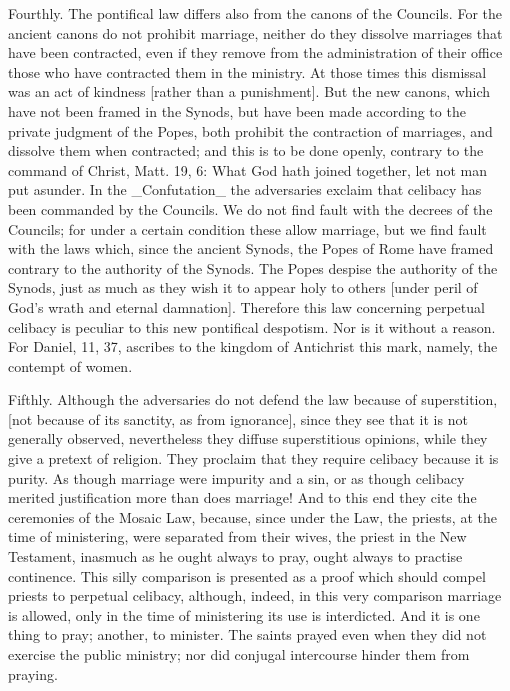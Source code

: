 Fourthly.  The pontifical law differs also from the canons of the
Councils.  For the ancient canons do not prohibit marriage, neither
do they dissolve marriages that have been contracted, even if they
remove from the administration of their office those who have
contracted them in the ministry.  At those times this dismissal was
an act of kindness [rather than a punishment].  But the new canons,
which have not been framed in the Synods, but have been made
according to the private judgment of the Popes, both prohibit the
contraction of marriages, and dissolve them when contracted; and this
is to be done openly, contrary to the command of Christ, Matt. 19, 6:
What God hath joined together, let not man put asunder.  In the
_Confutation_ the adversaries exclaim that celibacy has been
commanded by the Councils.  We do not find fault with the decrees of
the Councils; for under a certain condition these allow marriage, but
we find fault with the laws which, since the ancient Synods, the
Popes of Rome have framed contrary to the authority of the Synods.
The Popes despise the authority of the Synods, just as much as they
wish it to appear holy to others [under peril of God's wrath and
eternal damnation].  Therefore this law concerning perpetual celibacy
is peculiar to this new pontifical despotism.  Nor is it without a
reason.  For Daniel, 11, 37, ascribes to the kingdom of Antichrist
this mark, namely, the contempt of women.

Fifthly.  Although the adversaries do not defend the law because of
superstition, [not because of its sanctity, as from ignorance], since
they see that it is not generally observed, nevertheless they diffuse
superstitious opinions, while they give a pretext of religion.  They
proclaim that they require celibacy because it is purity.  As though
marriage were impurity and a sin, or as though celibacy merited
justification more than does marriage!  And to this end they cite the
ceremonies of the Mosaic Law, because, since under the Law, the
priests, at the time of ministering, were separated from their wives,
the priest in the New Testament, inasmuch as he ought always to pray,
ought always to practise continence.  This silly comparison is
presented as a proof which should compel priests to perpetual
celibacy, although, indeed, in this very comparison marriage is
allowed, only in the time of ministering its use is interdicted.  And
it is one thing to pray; another, to minister.  The saints prayed
even when they did not exercise the public ministry; nor did conjugal
intercourse hinder them from praying.

